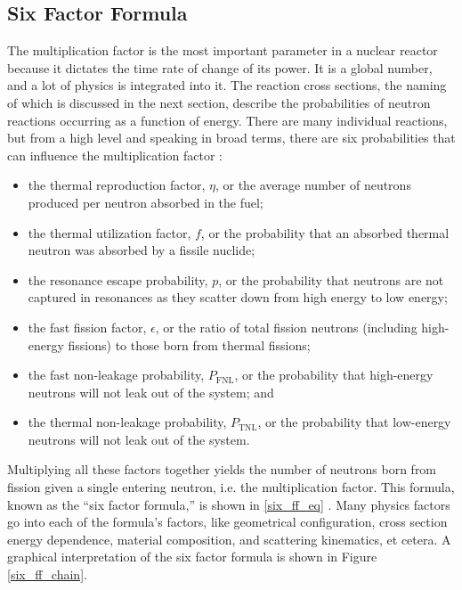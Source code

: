 \subsection{Six Factor Formula}

The multiplication factor is the most important parameter in a nuclear reactor because it dictates the time rate of change of its power.  It is a global number, and a lot of physics is integrated into it.   The reaction cross sections, the naming of which is discussed in the next section, describe the probabilities of neutron reactions occurring as a function of energy.  There are many individual reactions, but from a high level and speaking in broad terms, there are six probabilities that can influence the multiplication factor \cite{duderstadt}: 
\begin{itemize}
 \item the thermal reproduction factor, $\eta$, or the average number of neutrons produced per neutron absorbed in the fuel;
 \item the thermal utilization factor, $f$, or the probability that an absorbed thermal neutron was absorbed by a fissile nuclide;
 \item the resonance escape probability, $p$, or the probability that neutrons are not captured in resonances as they scatter down from high energy to low energy;
 \item the fast fission factor, $\epsilon$, or the ratio of total fission neutrons (including high-energy fissions) to those born from thermal fissions;
 \item the fast non-leakage probability, $P_\mathrm{FNL}$, or the probability that high-energy neutrons will not leak out of the system; and
 \item the thermal non-leakage probability, $P_\mathrm{TNL}$, or the probability that low-energy neutrons will not leak out of the system.	
\end{itemize}

Multiplying all these factors together yields the number of neutrons born from fission given a single entering neutron, i.e. the multiplication factor.  This formula, known as the ``six factor formula,'' is shown in \eqref{six_ff_eq} \cite{duderstadt}.  Many physics factors go into each of the formula's factors, like geometrical configuration, cross section energy dependence, material composition, and scattering kinematics, et cetera.  A graphical interpretation of the six factor formula is shown in Figure \ref{six_ff_chain}.

